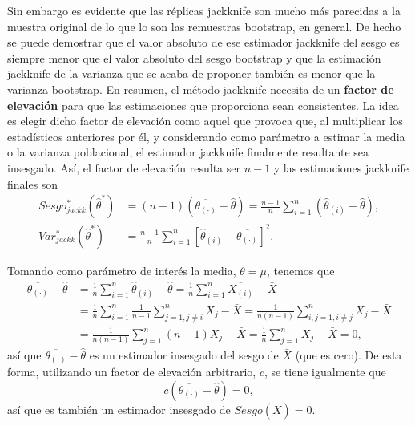 \documentclass[
]{book}
\theoremstyle{break}
\theoremstyle{nonumberplain}
\begin{document}
Sin embargo es evidente que las réplicas jackknife son mucho más parecidas a la muestra original de lo que lo son las remuestras bootstrap, en general.
De hecho se puede demostrar que el valor absoluto de ese estimador jackknife del sesgo es siempre menor que el valor absoluto del sesgo bootstrap y que la estimación jackknife de la varianza que se acaba de proponer también es menor que la varianza bootstrap.
En resumen, el método jackknife necesita de un \textbf{factor de elevación} para que las estimaciones que proporciona sean consistentes.
La idea es elegir dicho factor de elevación como aquel que provoca que, al multiplicar los estadísticos anteriores por él, y considerando como parámetro a estimar la media o la varianza poblacional, el estimador jackknife finalmente resultante sea insesgado.
Así, el factor de elevación resulta ser \(n-1\) y las estimaciones jackknife finales son
\[\begin{aligned}
Sesgo_{jackk}^{\ast}\left( \hat{\theta}^{\ast} \right) 
&= \left( n-1 \right)\left( \overline{\theta_{(\cdot)}}-\hat{\theta} \right) 
= \frac{n-1}{n}\sum_{i=1}^{n}\left( \hat \theta_{(i)} - \hat{\theta} \right), \\
Var_{jackk}^{\ast}\left( \hat{\theta}^{\ast} \right) 
&= \frac{n-1}{n} \sum_{i=1}^{n}\left[ \hat \theta_{(i)} 
- \overline{\theta_{(\cdot)}}\right]^2.
\end{aligned}\]

Tomando como parámetro de interés la media, \(\theta =\mu\), tenemos que
\[\begin{aligned}
\overline{\theta_{(\cdot)}} - \hat{\theta} 
&= \frac{1}{n}\sum_{i=1}^{n}\hat \theta_{(i)} - \hat{\theta}
= \frac{1}{n}\sum_{i=1}^{n} \overline{X_{(i)}}-\bar{X} \\
&= \frac{1}{n}\sum_{i=1}^{n}\frac{1}{n-1}\sum_{j=1,j\neq i}^{n}X_j - \bar{X}
= \frac{1}{n\left( n-1 \right)}\sum_{i,j=1,i\neq j}^{n}X_j - \bar{X} \\
&= \frac{1}{n\left( n-1 \right)}\sum_{j=1}^{n}\left( n-1 \right) X_j- \bar{X}
= \frac{1}{n}\sum_{j=1}^{n}X_j-\bar{X}=0,
\end{aligned}\]
así que \(\overline{\theta_{(\cdot)}}-\hat{\theta}\) es un estimador insesgado del sesgo de \(\bar{X}\) (que es cero).
De esta forma, utilizando un factor de elevación arbitrario, \(c\), se tiene igualmente que
\[c\left( \overline{\theta_{(\cdot)}} - \hat{\theta} \right) = 0,\]
así que es también un estimador insesgado de \(Sesgo\left( \bar{X} \right) =0\).
\end{document}
